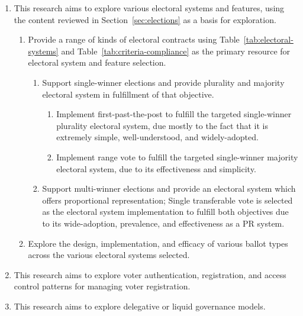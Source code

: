 \begin{enumerate}[topsep=0mm, leftmargin=*]
  \item This research aims to explore various electoral systems and features,
    using the content reviewed in Section~\ref{sec:elections} as a basis for
    exploration.

    \begin{enumerate}
      \item Provide a range of kinds of electoral contracts using
        Table~\ref{tab:electoral-systems} and
        Table~\ref{tab:criteria-compliance} as the primary resource for
        electoral system and feature selection.

        \begin{enumerate}
          \item Support single-winner elections and provide plurality and
            majority electoral system in fulfillment of that objective.

            \begin{enumerate}
              \item Implement first-past-the-post to fulfill the targeted
                single-winner plurality electoral system, due mostly to the fact
                that it is extremely simple, well-understood, and
                widely-adopted.

              \item Implement range vote to fulfill the targeted single-winner
                majority electoral system, due to its effectiveness and
                simplicity.
            \end{enumerate}

          \item Support multi-winner elections and provide an electoral system
            which offers proportional representation; Single transferable vote
            is selected as the electoral system implementation to fulfill both
            objectives due to its wide-adoption, prevalence, and effectiveness
            as a PR system.
        \end{enumerate}

      \item Explore the design, implementation, and efficacy of various ballot
        types across the various electoral systems selected.
    \end{enumerate}

  \item This research aims to explore voter authentication, registration, and
    access control patterns for managing voter registration.

  \item This research aims to explore delegative or liquid governance models.
\end{enumerate}

